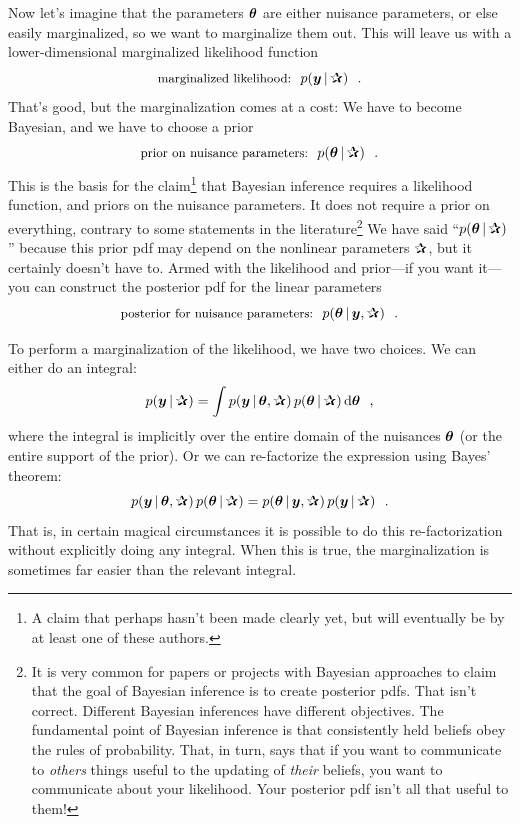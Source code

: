 Now let's imagine that the parameters $\boldsymbol{\theta}$ are either nuisance
parameters, or else easily marginalized, so we want to marginalize
them out.
This will leave us with a lower-dimensional marginalized likelihood
function
\begin{equation}
\mbox{\small marginalized likelihood:} \hquad p(\vy\given\bP) \hquad.
\end{equation}
That's good, but the marginalization comes at a cost:
We have to become Bayesian, and we have to choose a prior
\begin{equation}
\mbox{\small prior on nuisance parameters:} \hquad p(\vtheta\given\bP) \hquad.
\end{equation}
This is the basis for the claim\footnote{A claim that perhaps hasn't been made clearly
  yet, but will eventually be by at least one of these authors.} that Bayesian
inference requires a likelihood function, and priors on the nuisance parameters.
It does not require a prior on everything, contrary to some statements
in the literature\footnote{It is very common for papers or projects with
  Bayesian approaches to claim that the
  goal of Bayesian inference is to create posterior pdfs. That isn't correct.
  Different Bayesian inferences have different objectives. The fundamental
  point
  of Bayesian inference is that consistently held beliefs obey the rules of
  probability. That, in turn, says that if you want
  to communicate to \emph{others} things useful to the
  updating of \emph{their} beliefs, you want to communicate about your likelihood.
  Your posterior pdf isn't all that useful to them!\label{note:lf}}
We have said ``$p(\vtheta\given\bP)$'' because this prior pdf may depend on
the nonlinear parameters $\bP$, but it certainly doesn't have to.
Armed with the likelihood and prior---if you want it---you can construct
the posterior pdf for the linear parameters
\begin{equation}
\mbox{\small posterior for nuisance parameters:} \hquad p(\vtheta\given\vy,\bP) \hquad.
\end{equation}

To perform a marginalization of the likelihood, we have two choices.
We can either do an integral:
\begin{equation}
p(\vy\given\bP) = \int p(\vy\given\vtheta,\bP)\,p(\vtheta\given\bP)\,\dd\vtheta
\hquad,
\end{equation}
where the integral is implicitly over the entire domain of the
nuisances $\boldsymbol{\theta}$ (or the entire support of the prior).
Or we can re-factorize the expression using Bayes' theorem:
\begin{equation}
p(\vy\given\vtheta,\bP)\,p(\vtheta\given\bP)
 = p(\vtheta\given\vy,\bP)\,p(\vy\given\bP)
\hquad.
\end{equation}
That is, in certain magical circumstances it is possible to do this
re-factorization without explicitly doing any integral.
When this is true, the marginalization is sometimes far easier than
the relevant integral.

